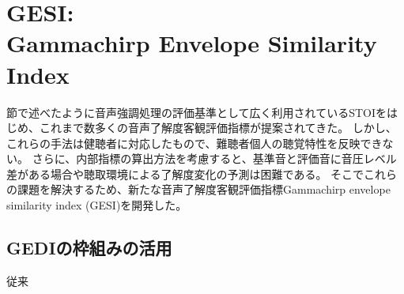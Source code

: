 \chapter[GESI: Gammachirp Envelope Similarity Index]{GESI:\\ \fontsize{19pt}{19pt}\selectfont Gammachirp Envelope Similarity Index}
\label{chap:GESI}
節で述べたように音声強調処理の評価基準として広く利用されているSTOI\cite{taal2011algorithm}をはじめ、これまで数多くの音声了解度客観評価指標が提案されてきた。
しかし、これらの手法は健聴者に対応したもので、難聴者個人の聴覚特性を反映できない。
さらに、内部指標の算出方法を考慮すると、基準音と評価音に音圧レベル差がある場合や聴取環境による了解度変化の予測は困難である。
そこでこれらの課題を解決するため、新たな音声了解度客観評価指標Gammachirp envelope similarity index (GESI)を開発した。



\section{GEDIの枠組みの活用}
従来